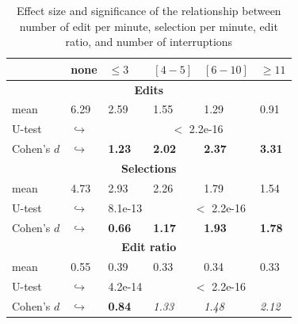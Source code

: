 \documentclass[times]{smrauth}
\begin{document}
\begin{table}[ht!]
\renewcommand{\arraystretch}{1.3}
\caption{Effect size and significance of the relationship between number of edit per minute, selection per minute, edit ratio, and number of interruptions} 
\label{tbl:p_value}
\centering
\begin{tabular}{l | p{0.75cm} | p{1.2cm} | p{1.2cm} | p{1.2cm} |p{1.2cm}} 

   & none & $\leq 3$ & $[4 - 5]$ & $[6 - 10]$ & $\geq 11$  \\  
  \hline
  \multicolumn{6}{c}{\textbf{Edits}} \\
  \hline
  mean & 6.29 &	2.59 & 1.55 & 1.29 & 0.91  \\ 
   \cline{3-6} 
  U-test & $\hookrightarrow$ & \multicolumn{4}{c}{$<$ 2.2e-16} \\
  \cline{3-6} 
  Cohen's $d$ & $\hookrightarrow$	& \textbf{1.23} & \textbf{2.02} & \textbf{2.37} & \textbf{3.31}    \\
  \hline
  
  
  \multicolumn{6}{c}{\textbf{Selections}} \\
  \hline 
  mean & 4.73 &	2.93 & 2.26 & 1.79 & 1.54  \\ 
     \cline{3-6} 
    U-test & $\hookrightarrow$ & 8.1e-13 & \multicolumn{3}{c}{$<$ 2.2e-16} \\
    
  \cline{3-6} 
  Cohen's $d$ & $\hookrightarrow$	& \textbf{0.66} & \textbf{1.17} & \textbf{1.93} & \textbf{1.78} \\  
\hline


  \multicolumn{6}{c}{\textbf{Edit ratio}} \\
  \hline 
  mean & 0.55 & 0.39 & 0.33 & 0.34 & 0.33 \\ 
  \cline{3-6} 
     \cline{3-6} 
    U-test & $\hookrightarrow$ & 4.2e-14 & \multicolumn{3}{c}{$<$ 2.2e-16} \\
    \cline{3-6} 
    Cohen's $d$ & $\hookrightarrow$ & \textbf{0.84} & \textit{1.33} & \textit{1.48} & \textit{2.12} \\ 
\hline

\end{tabular}
\end{table}
\end{document}
